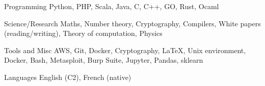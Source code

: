 


\begin{cvskills}
	
	
	\cvskill
	{Programming} %
	{Python, PHP, Scala, Java, C, C++, GO, Rust, Ocaml} %
	

	\cvskill
	{Science/Research} %
	{Maths, Number theory, Cryptography, Compilers, White papers (reading/writing), Theory of computation, Physics} %

	
	\cvskill
	{Tools and Misc} %
	{AWS, Git, Docker, Cryptography, \LaTeX, Unix environment, Docker, Bash, Metasploit, Burp Suite, Jupyter, Pandas, sklearn} %
	
	
	\cvskill
	{Languages} %
	{English (C2), French (native)} %
	
	
\end{cvskills}